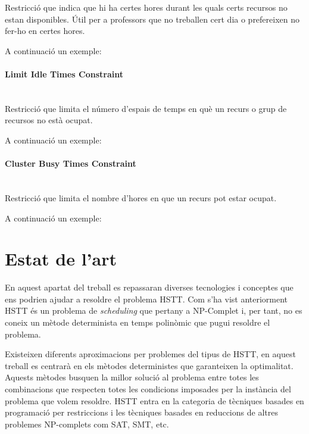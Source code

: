 \documentclass[11pt,a4paper,twoside]{report}
\begin{document}
  Restricció que indica que hi ha certes hores durant les quals certs recursos no estan disponibles. Útil per a professors que no treballen cert dia o prefereixen no fer-ho en certes hores.
  
  A continuació un exemple:

  
  
  \paragraph*{Limit Idle Times Constraint} ~\\

  Restricció que limita el número d'espais de temps en què un recurs o grup de recursos no està ocupat. 

  A continuació un exemple:

  
  \paragraph*{Cluster Busy Times Constraint} ~\\

  Restricció que limita el nombre d'hores en que un recurs pot estar ocupat.

  A continuació un exemple:

  


  

  \section{Estat de l'art}

  En aquest apartat del treball es repassaran diverses tecnologies i conceptes que ens podrien ajudar a resoldre el problema HSTT. 
  Com s'ha vist anteriorment HSTT és un problema de \textit{scheduling} que pertany a NP-Complet i, per tant, no es coneix un mètode determinista en temps polinòmic que pugui resoldre el problema. 

  Existeixen diferents aproximacions per problemes del tipus de HSTT, en aquest treball es centrarà en els mètodes deterministes que garanteixen la optimalitat. Aquests mètodes busquen la millor solució al problema entre totes les combinacions 
  que respecten totes les condicions imposades per la instància del problema que volem resoldre. HSTT entra en la categoria de tècniques basades en programació per restriccions i les tècniques basades en reduccions de altres problemes NP-complets com SAT, SMT, etc.
\end{document}
